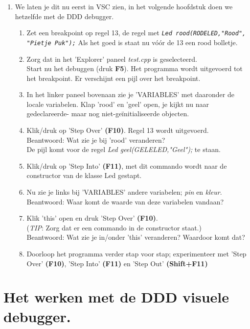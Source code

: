 \begin{enumerate} [label=\alph*]
	\item We laten je dit nu eerst in VSC zien, in het volgende hoofdstuk doen we hetzelfde met de DDD debugger.
	\begin{enumerate} [label=\roman*]
		
		\item Zet een breakpoint op regel 13, de regel met \texttt{\textit{Led rood(RODELED,"Rood", "Pietje Puk");}} Als het goed is staat nu vóór de 13 een rood bolletje.
		
		\item Zorg dat in het 'Explorer' paneel \textit{test.cpp} is geselecteerd. \\Start nu het debuggen (druk \textbf{F5}). Het programma wordt uitgevoerd tot het breakpoint.  Er verschijnt een pijl over het breakpoint. 
		\item In het linker paneel bovenaan zie je 'VARIABLES' met daaronder de locale variabelen. Klap 'rood' en 'geel' open, je kijkt nu naar gedeclareerde- maar nog niet-geïnitialiseerde objecten.
		\item Klik/druk op 'Step Over' \textbf{(F10)}. Regel 13 wordt uitgevoerd. 
		\\ Beantwoord: Wat zie je bij 'rood' veranderen? \\
		De pijl komt voor de regel \textit{Led geel(GELELED,"Geel");} te staan.
		\item Klik/druk op 'Step Into' \textbf{(F11)}, met dit commando wordt naar de constructor van de klasse Led gestapt. 
		\item Nu zie je links bij 'VARIABLES' andere variabelen; \textit{pin} en \textit{kleur}. \\Beantwoord: Waar komt de waarde van deze variabelen vandaan?
		\item Klik 'this' open en druk 'Step Over' \textbf{(F10)}.  \\(\textit{TIP}: Zorg dat er een commando in de constructor staat.) 
		\\Beantwoord: Wat zie je in/onder 'this' veranderen? Waardoor komt dat?
		\item Doorloop het programma verder stap voor stap; experimenteer met 'Step Over' \textbf{(F10)}, 'Step Into' \textbf{(F11)} en 'Step Out' \textbf{(Shift+F11)}
    \end{enumerate}
\end{enumerate}


\section{Het werken met de DDD visuele debugger.} \label{sec:startDDD}
 

